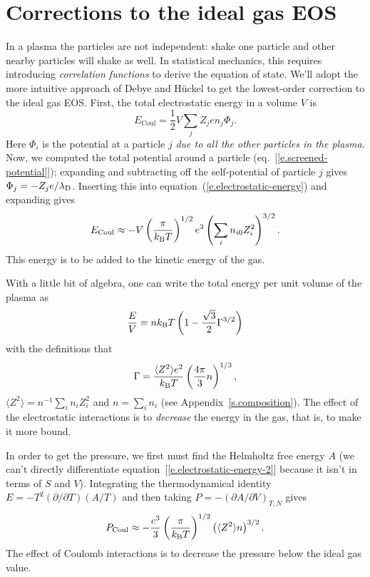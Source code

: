 \section{Corrections to the ideal gas EOS}\label{s.plasma-corrections}

In a plasma the particles are not independent: shake one particle and other nearby particles will shake as well. In statistical mechanics, this requires introducing \emph{correlation functions} to derive the equation of state.  We'll adopt the more intuitive approach of Debye and H\"uckel to get the lowest-order correction to the ideal gas EOS.  First, the total electrostatic energy in a volume $V$ is
\begin{equation}\label{e.electrostatic-energy}
E_{\mathrm{Coul}} = \frac{1}{2}V\sum_{j}Z_{j}e n_{j}\Phi_{j}.
\end{equation}
Here $\Phi_{i}$ is the potential at a particle $j$ \emph{due to all the other particles in the plasma.}  Now, we computed the total potential around a particle (eq.~[\ref{e.screened-potential}]); expanding and subtracting off the self-potential of particle $j$ gives $\Phi_{j} = -Z_{j}e/\lambda_{\mathrm{D}}$.  Inserting this into equation~(\ref{e.electrostatic-energy}) and expanding gives
\begin{equation}\label{e.electrostatic-energy-2}
E_{\mathrm{Coul}} \approx - V\left(\frac{\pi}{k_\mathrm{B} T}\right)^{1/2} e^{3} \left(\sum_{i}n_{i0} Z_{i}^{2}\right)^{3/2}.
\end{equation}
This energy is to be added to the kinetic energy of the gas.  

With a little bit of algebra, one can write the total energy per unit volume of the plasma as
\begin{equation}\label{e.total-energy-plasma-dh}
\frac{E}{V} = nk_\mathrm{B} T\left(1 - \frac{\sqrt{3}}{2}\Gamma^{3/2}\right)
\end{equation}
with the definitions that 
\begin{equation}\label{e.Gamma-definition-2}
\Gamma = \frac{\langle Z^{2}\rangle e^{2}}{k_\mathrm{B} T} \left(\frac{4\pi}{3}n\right)^{1/3},
\end{equation}
$\langle Z^{2}\rangle = n^{-1}\sum_{i} n_{i} Z_{i}^{2}$ and $n = \sum_{i}n_{i}$ (see Appendix~\ref{s.composition}).  The effect of the electrostatic interactions is to \emph{decrease} the energy in the gas, that is, to make it more bound.

In order to get the pressure, we first must find the Helmholtz free energy $A$ (we can't directly differentiate equation~[\ref{e.electrostatic-energy-2}] because it isn't in terms of $S$ and $V$). Integrating the thermodynamical identity $E = -T^{2}(\partial/\partial T)(A/T)$ and then taking $P = -(\partial A/\partial V)_{T,N}$ gives
\begin{equation}\label{e.pressure-correction}
 P_{\mathrm{Coul}} \approx -\frac{e^{3}}{3}\left(\frac{\pi}{k_\mathrm{B} T}\right)^{1/2}\left(\langle Z^{2}\rangle n\right)^{3/2}.
\end{equation}
The effect of Coulomb interactions is to decrease the pressure below the ideal gas value.

